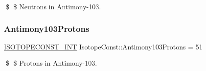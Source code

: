 \$ \$ Neutrons in Antimony-\/103. \mbox{\label{group___isotope_const-_antimony-_sb103_gaaa99a000e966453f0d89d4ca75f607d6}} 
\subsubsection{\texorpdfstring{Antimony103\+Protons}{Antimony103Protons}}
{\footnotesize\ttfamily \mbox{\hyperlink{group___isotope_const-_macros_ga5f18360b3e99483a35c32d789e62621c}{I\+S\+O\+T\+O\+P\+E\+C\+O\+N\+S\+T\+\_\+\+I\+NT}} Isotope\+Const\+::\+Antimony103\+Protons = 51}

\$ \$ Protons in Antimony-\/103. 
